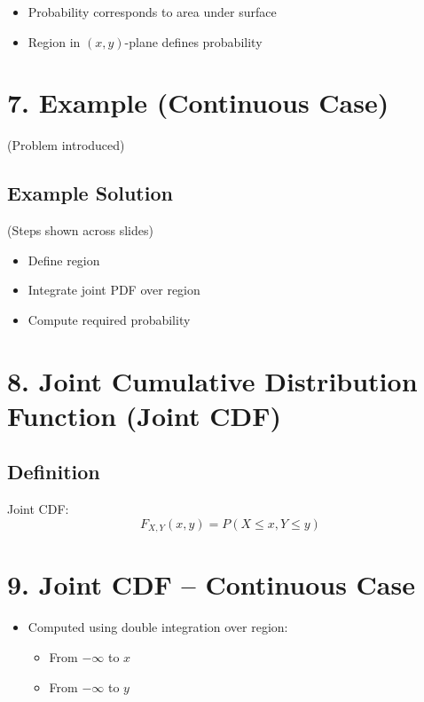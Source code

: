 \documentclass[12pt]{article}
\begin{document}
\begin{itemize}
    \item Probability corresponds to area under surface
    \item Region in $(x, y)$-plane defines probability
\end{itemize}

\section*{7. Example (Continuous Case)}

(Problem introduced)

\subsection*{Example Solution}

(Steps shown across slides)

\begin{itemize}
    \item Define region
    \item Integrate joint PDF over region
    \item Compute required probability
\end{itemize}

\section*{8. Joint Cumulative Distribution Function (Joint CDF)}

\subsection*{Definition}

Joint CDF:
\[
F_{X,Y}(x,y) = P(X \le x, Y \le y)
\]

\section*{9. Joint CDF -- Continuous Case}

\begin{itemize}
    \item Computed using double integration over region:
    \begin{itemize}
        \item From $-\infty$ to $x$
        \item From $-\infty$ to $y$
    \end{itemize}
\end{itemize}
\end{document}
